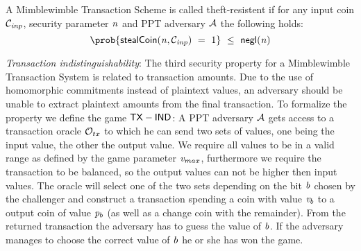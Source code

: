 \begin{center}
\end{center}

\begin{definition}
    A Mimblewimble Transaction Scheme is called theft-resistent if for any input coin $\mathcal{C}_{\mathit{inp}}$, security parameter $\mathit{n}$ and PPT adversary $\mathcal{A}$ the following holds:
    \[ \prob{\procStealCoin{\varN}{\varCoinInp} \opEqNoQ 1 } \opSmEq \funNegl{\varN} \]
\end{definition}

\emph{Transaction indistinguishability}: The third security property for a Mimblewimble Transaction System is related to transaction amounts. Due to the use of homomorphic commitments instead of plaintext values,
an adversary should be unable to extract plaintext amounts from the final transaction. To formalize the property we define the game $\mathsf{TX-IND}$:
A PPT adversary $\mathcal{A}$ gets access to a transaction oracle $\mathcal{O}_{tx}$ to which he can send two sets of values, one being the input value, the other the output value. We require all values to be in
a valid range as defined by the game parameter $\mathit{v}_{max}$, furthermore we require the transaction to be balanced, so the output values can not be higher then input values. The oracle will select one of the two
sets depending on the bit $\mathit{b}$ chosen by the challenger and construct a transaction spending a coin with value $\mathit{v}_b$ to a output coin of value $\mathit{p}_b$ (as well as a change coin with the remainder).
From the returned transaction the adversary has to guess the value of $\mathit{b}$.
If the adversary manages to choose the correct value of $\mathit{b}$ he or she has won the game.

